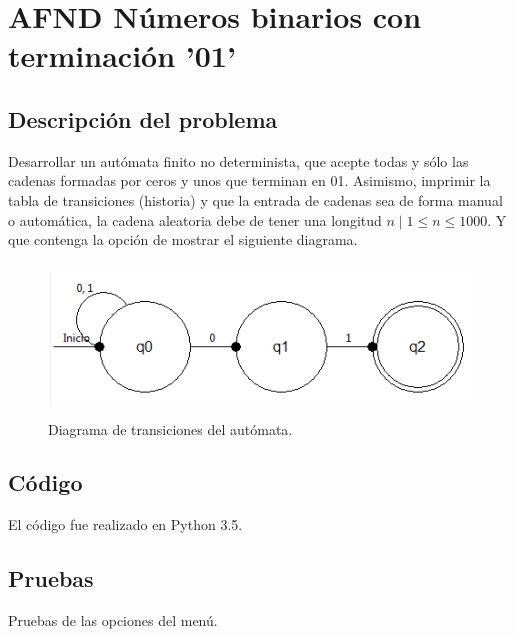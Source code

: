 \section{AFND Números binarios con terminación '01'}
	\subsection{Descripción del problema}
	Desarrollar un autómata finito no determinista, que acepte todas y sólo las cadenas formadas por ceros y unos que terminan en 01. Asimismo, imprimir la tabla de transiciones (historia) y que la entrada de cadenas sea de forma manual o automática, la cadena aleatoria debe de tener una longitud $n \mid 1  \leq n \leq 1000$. Y que contenga la opción de mostrar el siguiente diagrama.
	\begin{figure}[H]
		\begin{center}
			\includegraphics[width=12cm, height=4cm]{img/cero-uno.png}
			\caption{Diagrama de transiciones del autómata. \cite{LIBRO}}
			\label{fig:diagrama4}
		\end{center}
	\end{figure}
	
	\subsection{Código}
	El código fue realizado en Python 3.5.
	\subsection{Pruebas}
	Pruebas de las opciones del menú.